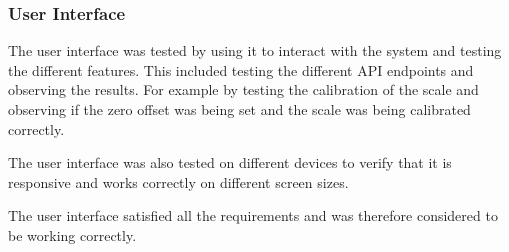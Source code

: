 \subsubsection{User Interface}
The user interface was tested by using it to interact with the system and testing the different features. This included testing the different API endpoints and observing the results. For example by testing the calibration of the scale and observing if the zero offset was being set and the scale was being calibrated correctly.

The user interface was also tested on different devices to verify that it is responsive and works correctly on different screen sizes.

The user interface satisfied all the requirements and was therefore considered to be working correctly.